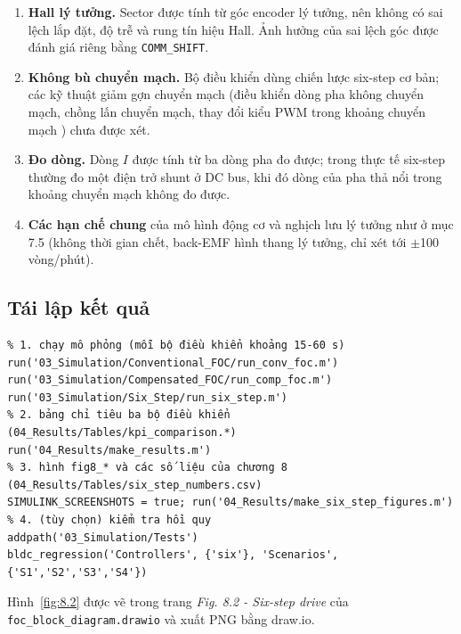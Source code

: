 \begin{enumerate}[leftmargin=*]
\item \textbf{Hall lý tưởng.} Sector được tính từ góc encoder lý tưởng, nên không có sai lệch lắp đặt, độ trễ và rung tín hiệu Hall. Ảnh hưởng của sai lệch góc được đánh giá riêng bằng \texttt{COMM\_SHIFT}.
\item \textbf{Không bù chuyển mạch.} Bộ điều khiển dùng chiến lược six-step cơ bản; các kỹ thuật giảm gợn chuyển mạch (điều khiển dòng pha không chuyển mạch, chồng lấn chuyển mạch, thay đổi kiểu PWM trong khoảng chuyển mạch \cite{r3}) chưa được xét.
\item \textbf{Đo dòng.} Dòng $I$ được tính từ ba dòng pha đo được; trong thực tế six-step thường đo một điện trở shunt ở DC bus, khi đó dòng của pha thả nổi trong khoảng chuyển mạch không đo được.
\item \textbf{Các hạn chế chung} của mô hình động cơ và nghịch lưu lý tưởng như ở mục 7.5 (không thời gian chết, back-EMF hình thang lý tưởng, chỉ xét tới $\pm$100 vòng/phút).
\end{enumerate}

\subsection{Tái lập kết quả}\label{sec:8.9}

\begin{Verbatim}
% 1. chạy mô phỏng (mỗi bộ điều khiển khoảng 15-60 s)
run('03_Simulation/Conventional_FOC/run_conv_foc.m')
run('03_Simulation/Compensated_FOC/run_comp_foc.m')
run('03_Simulation/Six_Step/run_six_step.m')
% 2. bảng chỉ tiêu ba bộ điều khiển (04_Results/Tables/kpi_comparison.*)
run('04_Results/make_results.m')
% 3. hình fig8_* và các số liệu của chương 8 (04_Results/Tables/six_step_numbers.csv)
SIMULINK_SCREENSHOTS = true; run('04_Results/make_six_step_figures.m')
% 4. (tùy chọn) kiểm tra hồi quy
addpath('03_Simulation/Tests')
bldc_regression('Controllers', {'six'}, 'Scenarios', {'S1','S2','S3','S4'})
\end{Verbatim}

Hình~\ref{fig:8.2} được vẽ trong trang \emph{Fig. 8.2 - Six-step drive} của \texttt{foc\_block\_diagram.drawio} và xuất PNG bằng draw.io.
